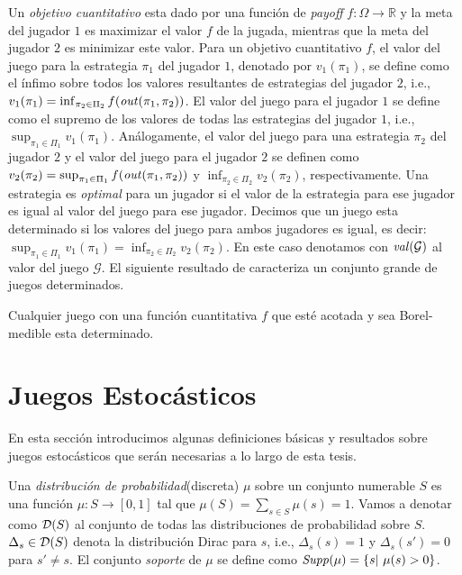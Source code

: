 Un \emph{objetivo cuantitativo} esta dado por una función de \emph{payoff} $f: \Omega \rightarrow \mathbb{R}$ y la meta del jugador $1$ es maximizar el valor $f$ de la jugada, mientras que la meta del jugador $2$ es minimizar este valor. Para un objetivo cuantitativo $f$, el valor del juego para la estrategia $\pi_1$ del jugador $1$, denotado por $v_1(\pi_1)$, se define como el ínfimo sobre todos los valores resultantes de estrategias del jugador $2$, i.e., $v_1(\pi_1) = \inf_{\pi_2 \in \Pi_2} f(\mathit{out}(\pi_1, \pi_2))$. El valor del juego para el jugador $1$ se define como el supremo de los valores de todas las estrategias del jugador $1$, i.e., $\sup_{\pi_1 \in \Pi_1} v_1(\pi_1)$. Análogamente, el valor del juego para una estrategia $\pi_2$ del jugador $2$ y el valor del juego para el jugador $2$ se definen como $v_2(\pi_2) = \sup_{\pi_1 \in \Pi_1} f(\mathit{out}(\pi_1, \pi_2))$ 
y $\inf_{\pi_2 \in \Pi_2} v_2(\pi_2)$, respectivamente.
Una estrategia es \emph{optimal} para un jugador si el valor de la estrategia para ese jugador es igual al valor del juego para ese jugador. Decimos que un juego esta determinado si los valores del juego para ambos jugadores es igual, es decir:
$\sup_{\pi_1 \in \Pi_1} v_1(\pi_1) = \inf_{\pi_2 \in \Pi_2} v_2(\pi_2)$. En este caso denotamos con $\mathit{val}(\mathcal{G})$ al valor del juego $\mathcal{G}$.
    El siguiente resultado de \cite{Martin98} caracteriza un conjunto grande de juegos determinados.
    \begin{theorem} Cualquier juego con una función cuantitativa $f$ que esté acotada y sea Borel-medible esta determinado.
\end{theorem}

\section{Juegos Estocásticos}

En esta sección introducimos algunas definiciones básicas y resultados sobre juegos estocásticos que serán necesarias a lo largo de esta tesis.

Una \emph{distribución de probabilidad}(discreta) $\mu$ sobre un conjunto numerable $S$ es una función $\mu: S \rightarrow [0, 1] $  tal que 
$\mu(S) = \sum_{s \in S} \mu(s) = 1$. 
Vamos a denotar como $\mathcal{D}(S)$ al conjunto de todas las distribuciones de probabilidad sobre $S$. $\Delta_s \in \mathcal{D}(S)$ denota la distribución Dirac para $s$, i.e., 
$\Delta_s(s) =1$ y $\Delta_s(s') = 0$ para $s'\neq s$.
El conjunto \textit{soporte} de $\mu$ se define como $\mathit{Supp}(\mu) = \{s |~\mu (s) > 0\}$.

